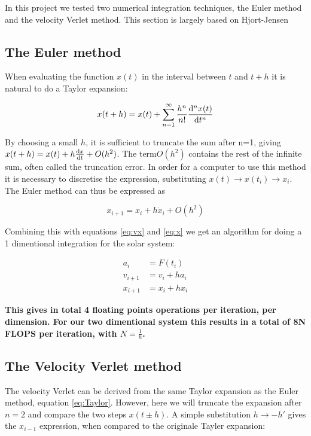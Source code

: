 
In this project we tested two numerical integration techniques, the Euler method and the velocity Verlet method.  This section is largely based on Hjort-Jensen \cite{Jensen}	



\subsection{The Euler  method}


When evaluating the function $ x(t)$ in the interval between $ t $ and $ t+h $ it is natural to do a Taylor expansion:  

\begin{equation}
x(t+h) = x(t) +\sum\limits_{n=1}^{\infty} 	\frac{ h^n}{n!}\dv[n]{x(t)}{t}   \label{eq:Taylor}
\end{equation}

By choosing a small $ h $, it is sufficient to truncate the sum after n=1, giving  $ x(t+h) = x(t) + h \dv{x}{t} + O(h^2) $. The term$ O(h^2) $ contains the rest of  the infinite sum, often called the truncation error. In order for a computer to use this method it is necessary to discretise  the expression, substituting $ x(t) \rightarrow x( t_i ) \rightarrow x_i$. The Euler method can thus be expressed as 

\begin{equation}
	x_{i+1} = x_i + h\dot{x}_i + O(h^2)
\end{equation}
 
 Combining this with equations  \ref{eq:vx} and \ref{eq:x} we get an algorithm for doing a  1 dimentional integration for the solar system:
 
 \begin{align}
 a_i &= F(t_i)\\
 v_{i+1} &= v_i + ha_i\\
  x_{i+1} &= x_i + hx_i
 \end{align}
 
\textbf{ This gives in total 4 floating points operations per iteration, per dimension. For our two dimentional system this results in a total of 8N FLOPS per iteration, with $ N = \frac{1}{h} $.}
 
 


\subsection{The Velocity Verlet method}

The velocity Verlet can be derived from the same Taylor expansion as the Euler method, equation \ref{eq:Taylor}. However, here we will truncate the expansion after $ n=2 $ and compare the two steps $ x(t\pm h) $. A simple substitution $ h\rightarrow -h' $ gives the $ x_{i-1} $ expression, when compared to the originale Tayler expansion: 

